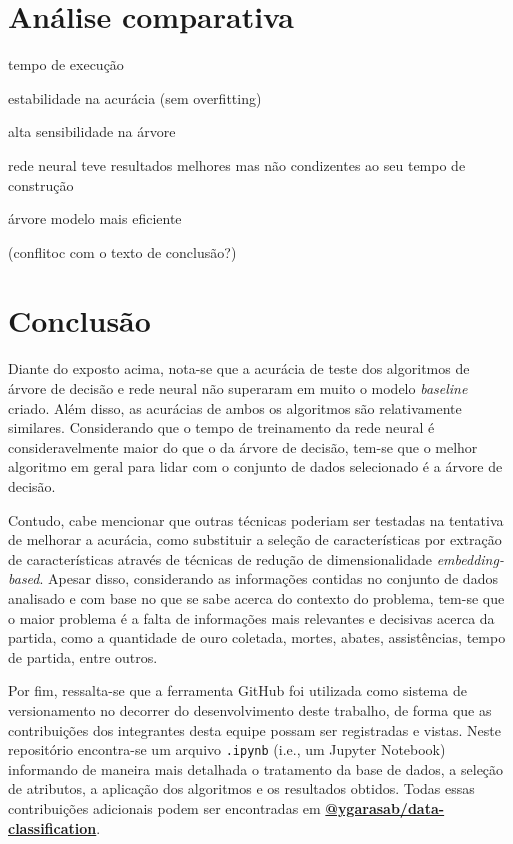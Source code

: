 \documentclass[12pt]{article}
\begin{document}
\section{Análise comparativa}\label{sec:analise}

tempo de execução

estabilidade na acurácia (sem overfitting)

alta sensibilidade na árvore

rede neural teve resultados melhores mas não condizentes ao seu tempo de construção

árvore modelo mais eficiente

(conflitoc com o texto de conclusão?)

\section{Conclusão}\label{sec:conclusao}
Diante do exposto acima, nota-se que a acurácia de teste dos algoritmos de árvore de decisão e rede neural não superaram em muito o modelo \textit{baseline} criado. Além disso, as acurácias de ambos os algoritmos são relativamente similares.  Considerando que o tempo de treinamento da rede neural é consideravelmente maior do que o da árvore de decisão, tem-se que o melhor algoritmo em geral para lidar com o conjunto de dados selecionado é a árvore de decisão. 

Contudo, cabe mencionar que outras técnicas poderiam ser testadas na tentativa de melhorar a acurácia, como substituir a seleção de características por extração de características através de técnicas de redução de dimensionalidade \textit{embedding-based}. Apesar disso, considerando as informações contidas no conjunto de dados analisado e com base no que se sabe acerca do contexto do problema, tem-se que o maior problema é a falta de informações mais relevantes e decisivas acerca da partida, como a quantidade de ouro coletada, mortes, abates, assistências, tempo de partida, entre outros. 

Por fim, ressalta-se que a ferramenta GitHub foi utilizada como sistema de versionamento no decorrer do desenvolvimento deste trabalho, de forma que as contribuições dos integrantes desta equipe possam ser registradas e vistas. Neste repositório encontra-se um arquivo \texttt{.ipynb} (i.e., um Jupyter Notebook) informando de maneira mais detalhada o tratamento da base de dados, a seleção de atributos, a aplicação dos algoritmos e os resultados obtidos. Todas essas contribuições adicionais podem ser encontradas em \textbf{\href{https://github.com/ygarasab/data-classification}{@ygarasab/data-classification}}.




\end{document}
